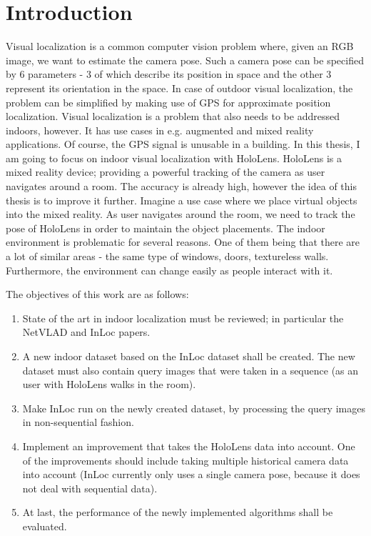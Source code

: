 \documentclass[twoside]{ctuthesis}
\theoremstyle{plain}
\theoremstyle{definition}
\theoremstyle{note}
\begin{document}
\maketitle


\chapter{Introduction}

Visual localization is a common computer vision problem where, given an RGB image, we want to estimate the camera pose. Such a camera pose can be specified by 6 parameters - 3 of which describe its position in space and the other 3 represent its orientation in the space. In case of outdoor visual localization, the problem can be simplified by making use of GPS for approximate position localization. Visual localization is a problem that also needs to be addressed indoors, however. It has use cases in e.g. augmented and mixed reality applications. Of course, the GPS signal is unusable in a building. In this thesis, I am going to focus on indoor visual localization with HoloLens. HoloLens is a mixed reality device; providing a powerful tracking of the camera as user navigates around a room. The accuracy is already high, however the idea of this thesis is to improve it further. Imagine a use case where we place virtual objects into the mixed reality. As user navigates around the room, we need to track the pose of HoloLens in order to maintain the object placements. The indoor environment is problematic for several reasons. One of them being that there are a lot of similar areas - the same type of windows, doors, textureless walls. Furthermore, the environment can change easily as people interact with it.

The objectives of this work are as follows:

\begin{enumerate}
	\item State of the art in indoor localization must be reviewed; in particular the NetVLAD \cite{Arandjelovic16} and InLoc \cite{taira2018inloc} papers.
	\item A new indoor dataset based on the InLoc dataset \cite{taira2018inloc} shall be created. The new dataset must also contain query images that were taken in a sequence (as an user with HoloLens walks in the room).
	\item Make InLoc run on the newly created dataset, by processing the query images in non-sequential fashion.
	\item Implement an improvement that takes the HoloLens data into account. One of the improvements should include taking multiple historical camera data into account (InLoc currently only uses a single camera pose, because it does not deal with sequential data).
	\item At last, the performance of the newly implemented algorithms shall be evaluated.
\end{enumerate}
\end{document}
